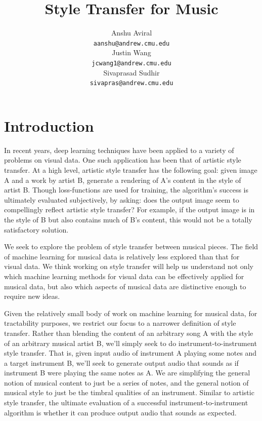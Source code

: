 \documentclass{article}
\title{Style Transfer for Music}
\author{
  Anshu Aviral\\
  \texttt{aanshu@andrew.cmu.edu} \\
  \And
  Justin Wang\\
  \texttt{jcwang1@andrew.cmu.edu} \\
  \And
  Sivaprasad Sudhir\\
  \texttt{sivapras@andrew.cmu.edu} 
}
\begin{document}

\maketitle

\section{Introduction}

In recent years, deep learning techniques have been applied to a variety of problems on visual data.  
One such application has been that of artistic style transfer.
At a high level, artistic style transfer has the following goal: given image A and a work by artist B, generate a rendering of A's content in the style of artist B.
Though loss-functions are used for training, the algorithm's success is ultimately evaluated subjectively, by asking: does the output image seem to compellingly reflect artistic style transfer?
For example, if the output image is in the style of B but also contains much of B's content, this would not be a totally satisfactory solution.

We seek to explore the problem of style transfer between musical pieces.
The field of machine learning for musical data is relatively less explored than that for visual data. We think working on style transfer will help us understand not only which machine learning methods for visual data can be effectively applied for musical data, but also which aspects of musical data are distinctive enough to require new ideas.

Given the relatively small body of work on machine learning for musical data, for tractability purposes, we restrict our focus to a narrower definition of style transfer.
Rather than blending the content of an arbitrary song A with the style of an arbitrary musical artist B, we'll simply seek to do instrument-to-instrument style transfer.
That is, given input audio of instrument A playing some notes and a target instrument B,
we'll seek to generate output audio that sounds as if instrument B were playing the same notes as A.
We are simplifying the general notion of musical content to just be a series of notes,
and the general notion of musical style to just be the timbral qualities of an instrument.
Similar to artistic style transfer, the ultimate evaluation of a successful instrument-to-instrument algorithm is whether it can produce output audio that sounds as expected.
\end{document}
